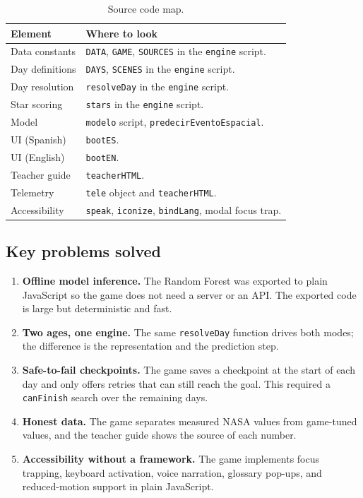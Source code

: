\documentclass[11pt,a4paper]{article}
\newcommand{\code}[1]{\texttt{#1}}
\begin{document}
\begin{table}[H]
\centering
\small
\begin{tabular}{@{}p{4.0cm}p{10.4cm}@{}}
\toprule
\textbf{Element} & \textbf{Where to look}\\
\midrule
Data constants & \code{DATA}, \code{GAME}, \code{SOURCES} in the \code{engine} script.\\
Day definitions & \code{DAYS}, \code{SCENES} in the \code{engine} script.\\
Day resolution & \code{resolveDay} in the \code{engine} script.\\
Star scoring & \code{stars} in the \code{engine} script.\\
Model & \code{modelo} script, \code{predecirEventoEspacial}.\\
UI (Spanish) & \code{bootES}.\\
UI (English) & \code{bootEN}.\\
Teacher guide & \code{teacherHTML}.\\
Telemetry & \code{tele} object and \code{teacherHTML}.\\
Accessibility & \code{speak}, \code{iconize}, \code{bindLang}, modal focus trap.\\
\bottomrule
\end{tabular}
\caption{Source code map.}
\label{tab:sourcemap}
\end{table}

\subsection{Key problems solved}

\begin{enumerate}
  \item \textbf{Offline model inference.} The Random Forest was exported to plain JavaScript so the game does not need a server or an API. The exported code is large but deterministic and fast.
  \item \textbf{Two ages, one engine.} The same \code{resolveDay} function drives both modes; the difference is the representation and the prediction step.
  \item \textbf{Safe-to-fail checkpoints.} The game saves a checkpoint at the start of each day and only offers retries that can still reach the goal. This required a \code{canFinish} search over the remaining days.
  \item \textbf{Honest data.} The game separates measured NASA values from game-tuned values, and the teacher guide shows the source of each number.
  \item \textbf{Accessibility without a framework.} The game implements focus trapping, keyboard activation, voice narration, glossary pop-ups, and reduced-motion support in plain JavaScript.
\end{enumerate}
\end{document}
